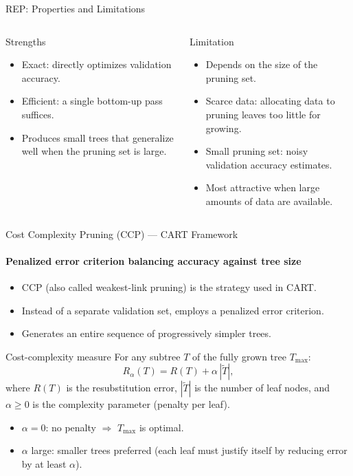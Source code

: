 \begin{frame}{REP: Properties and Limitations}
  \begin{columns}[t]
      \begin{block}{Strengths}
        \begin{itemize}
          \item \alert{Exact}: directly optimizes validation accuracy.
          \item \alert{Efficient}: a single bottom-up pass suffices.
          \item Produces small trees that generalize well when the pruning set is large.
        \end{itemize}
      \end{block}
      \begin{alertblock}{Limitation}
        \begin{itemize}
          \item Depends on the \alert{size of the pruning set}.
          \item Scarce data: allocating data to pruning leaves too little for growing.
          \item Small pruning set: noisy validation accuracy estimates.
          \item Most attractive when \alert{large amounts of data} are available.
        \end{itemize}
      \end{alertblock}
  \end{columns}
\end{frame}

\begin{frame}{Cost Complexity Pruning (CCP) — CART Framework}
  \framesubtitle{Penalized error criterion balancing accuracy against tree size}
  \begin{itemize}
    \item CCP (also called \alert{weakest-link pruning}) is the strategy used in CART.
    \item Instead of a separate validation set, employs a \alert{penalized error criterion}.
    \item Generates an entire sequence of progressively simpler trees.
  \end{itemize}
  \begin{block}{Cost-complexity measure}
    For any subtree $T$ of the fully grown tree $T_{\max}$:
    \[
      R_\alpha(T) = R(T) + \alpha\,|\tilde{T}|,
    \]
    where $R(T)$ is the resubstitution error, $|\tilde{T}|$ is the number of leaf nodes, and
    $\alpha \geq 0$ is the \alert{complexity parameter} (penalty per leaf).
  \end{block}
  \begin{itemize}
    \item $\alpha = 0$: no penalty $\Rightarrow$ $T_{\max}$ is optimal.
    \item $\alpha$ large: smaller trees preferred (each leaf must justify itself by reducing error by at
          least $\alpha$).
  \end{itemize}
\end{frame}

